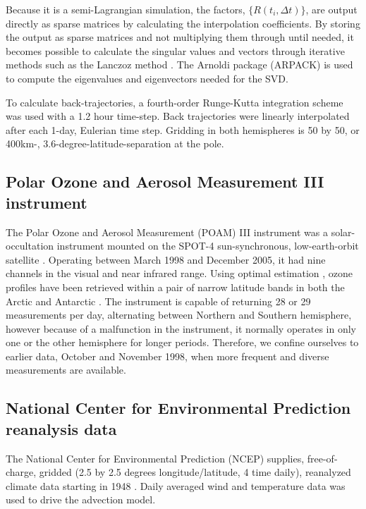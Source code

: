 Because it is a semi-Lagrangian simulation, the factors, $\lbrace R(t_i,\Delta t) \rbrace$,
are output directly as sparse matrices by calculating the interpolation coefficients.
By storing the output as sparse matrices and not multiplying them through until
needed, it becomes possible to calculate the singular values and vectors through iterative
methods such as the Lanczoz method \citep{Golub_Van_Loan1996}.
The Arnoldi package (ARPACK) \citep{Lehoucq_Scott1996} is used to compute the
eigenvalues and eigenvectors needed for the SVD.

To calculate back-trajectories, a fourth-order Runge-Kutta integration scheme
was used with a 1.2 hour time-step.
Back trajectories were linearly interpolated after each 1-day, Eulerian time step.
Gridding in both hemispheres is 50 by 50, or 400km-,
3.6-degree-latitude-separation at the pole.

\subsection{Polar Ozone and Aerosol Measurement III instrument}

The Polar Ozone and Aerosol Measurement (POAM) III instrument was a solar-
occultation instrument mounted on the SPOT-4 sun-synchronous, low-earth-orbit
satellite \citep{Lucke_etal1999}.
Operating between March 1998 and December 2005,
it had nine channels in the visual and near infrared range.
Using optimal estimation \citep{Rodgers2000}, ozone profiles have been retrieved 
within a pair of narrow latitude bands in both the Arctic and Antarctic \citep{Lumpe_etal2002}.  
The instrument is capable of returning 28 or 29 measurements per day,
alternating between Northern and Southern hemisphere, however because of
a malfunction
in the instrument, it normally operates in only one or the other hemisphere for longer periods.  Therefore, we confine ourselves to earlier data,
October and November 1998, when more frequent and diverse measurements
are available.

\subsection{National Center for Environmental Prediction reanalysis data}

The National Center for Environmental Prediction (NCEP) supplies, 
free-of-charge,
gridded (2.5 by 2.5 degrees longitude/latitude, 4 time daily), reanalyzed 
climate data starting in 1948 \citep{Kalnay_etal1996}.
Daily averaged wind and temperature data was used to drive the advection model.


